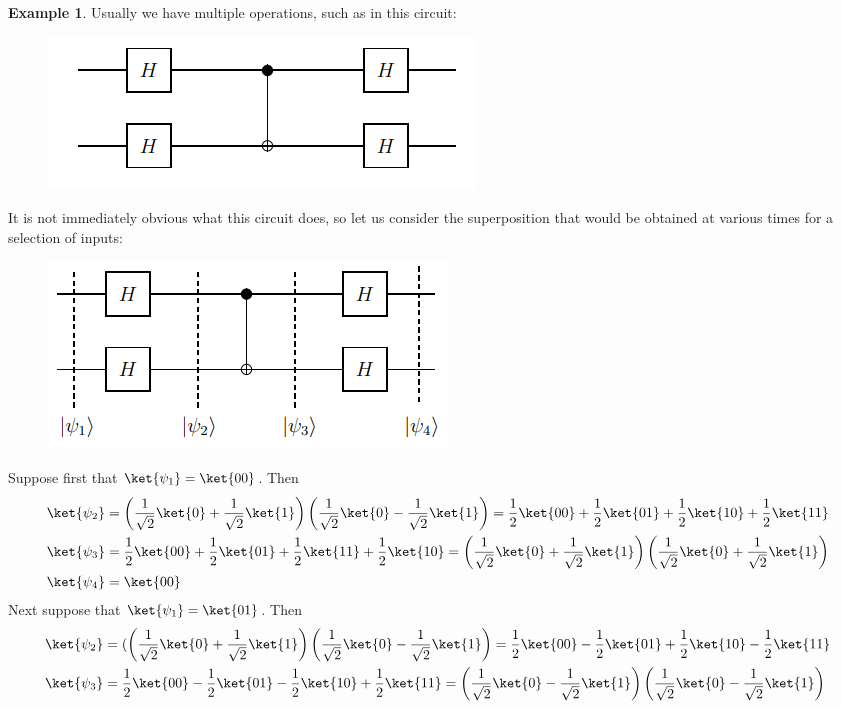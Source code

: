 \documentclass[12pt, oneside]{book}
\theoremstyle{definition}
\theoremstyle{definition}
\newtheorem{example}{Example}[section]
\theoremstyle{remark}
\begin{document}
\begin{example}
    Usually we have multiple operations, such as in this circuit:
    \begin{figure}[H]
        \centering
        \includegraphics[width=0.65\linewidth]{../images/circ-exe6_1.png}
    \end{figure}
    It is not immediately obvious what this circuit does, so let us consider the superposition that would be obtained at various times for a selection of inputs:
\begin{figure}[H]
    \centering
    \includegraphics[width=0.65\linewidth]{../images/circ-exe6_2.png}
\end{figure}
    Suppose first that $\ket{\psi_1}=\ket{00}$. Then
    \begin{align*}
    \ket{\psi_2}&=\left(\frac{1}{\sqrt{2}}\ket{0}+\frac{1}{\sqrt{2}}\ket{1}\right)\left(\frac{1}{\sqrt{2}}\ket{0}-\frac{1}{\sqrt{2}}\ket{1}\right) = \frac{1}{2}\ket{00}+\frac{1}{2}\ket{01}+\frac{1}{2}\ket{10}+\frac{1}{2}\ket{11}\\
    \ket{\psi_3}&=\frac{1}{2}\ket{00}+\frac{1}{2}\ket{01}+\frac{1}{2}\ket{11}+\frac{1}{2}\ket{10}=\left(\frac{1}{\sqrt{2}}\ket{0}+\frac{1}{\sqrt{2}}\ket{1}\right)\left(\frac{1}{\sqrt{2}}\ket{0}+\frac{1}{\sqrt{2}}\ket{1}\right)\\
    \ket{\psi_4}&=\ket{00}
    \end{align*}
    Next suppose that $\ket{\psi_1}=\ket{01}$. Then
    \begin{align*}
    \ket{\psi_2}&=(\left(\frac{1}{\sqrt{2}}\ket{0}+\frac{1}{\sqrt{2}}\ket{1}\right)\left(\frac{1}{\sqrt{2}}\ket{0}-\frac{1}{\sqrt{2}}\ket{1}\right)=\frac{1}{2}\ket{00}-\frac{1}{2}\ket{01}+\frac{1}{2}\ket{10}-\frac{1}{2}\ket{11}\\
    \ket{\psi_3}&=\frac{1}{2}\ket{00}-\frac{1}{2}\ket{01}-\frac{1}{2}\ket{10}+\frac{1}{2}\ket{11}=\left(\frac{1}{\sqrt{2}}\ket{0}-\frac{1}{\sqrt{2}}\ket{1}\right)\left(\frac{1}{\sqrt{2}}\ket{0}-\frac{1}{\sqrt{2}}\ket{1}\right)\\

\end{align*}
\end{example}
\end{document}
